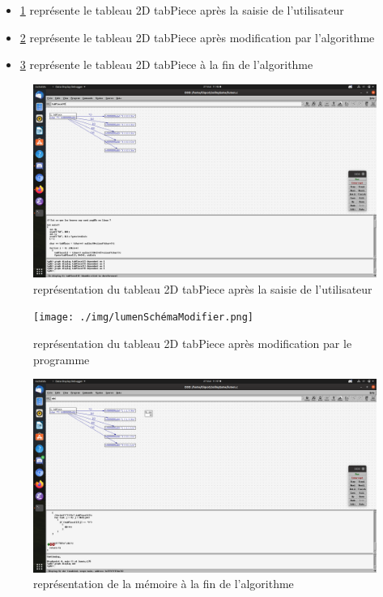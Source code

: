\documentclass[11pt]{article}
\begin{document}
\begin{itemize}
\item \ref{fig:org6036ad3} représente le tableau 2D tabPiece après la saisie de l'utilisateur
\item \ref{fig:org4c5bfc9} représente le tableau 2D tabPiece après modification par l'algorithme
\item \ref{fig:org50822e7}  représente le tableau 2D tabPiece à la fin de l'algorithme
\end{itemize}


\begin{figure}[htbp]
\centering
\includegraphics[width=.9\linewidth]{./img/lumenSchémaDébut.png}
\caption{\label{fig:org6036ad3}
représentation du tableau 2D tabPiece après la saisie de l'utilisateur}
\end{figure}



\begin{figure}[htbp]
\centering
\texttt{[image: ./img/lumenSchémaModifier.png]}
\caption{\label{fig:org4c5bfc9}
représentation du tableau 2D tabPiece après modification par le programme}
\end{figure}




\begin{figure}[htbp]
\centering
\includegraphics[width=.9\linewidth]{./img/lumenFin.png}
\caption{\label{fig:org50822e7}
représentation de la mémoire à la fin de l'algorithme}
\end{figure}
\end{document}
